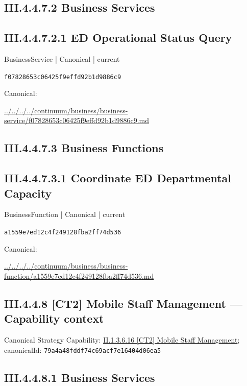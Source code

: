 \documentclass[10pt,a4paper]{article}
\begin{document}
\subsection*{III.4.4.7.2 Business Services}
\subsection*{III.4.4.7.2.1 ED Operational Status Query}
\label{element-f07828653c06425f9effd92b1d9886c9}
{\small BusinessService | Canonical | current}\par
\texttt{f07828653c06425f9effd92b1d9886c9}\par
Canonical: \par
{\footnotesize\url{../../../../continuum/business/business-service/f07828653c06425f9effd92b1d9886c9.md}}\par
\subsection*{III.4.4.7.3 Business Functions}
\subsection*{III.4.4.7.3.1 Coordinate ED Departmental Capacity}
\label{element-a1559e7ed12c4f249128fba2ff74d536}
{\small BusinessFunction | Canonical | current}\par
\texttt{a1559e7ed12c4f249128fba2ff74d536}\par
Canonical: \par
{\footnotesize\url{../../../../continuum/business/business-function/a1559e7ed12c4f249128fba2ff74d536.md}}\par
\subsection*{III.4.4.8 [CT2] Mobile Staff Management — Capability context}
Canonical Strategy Capability: \hyperref[element-79a4a48fddf74c69acf7e16404d06ea5]{II.1.3.6.16 [CT2] Mobile Staff Management}; canonicalId: \texttt{79a4a48fddf74c69acf7e16404d06ea5}\par
\subsection*{III.4.4.8.1 Business Services}
\end{document}
